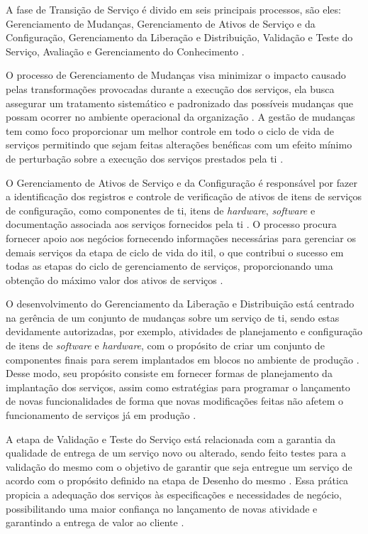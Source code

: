 A fase de Transição de Serviço é divido em seis principais processos, são eles: Gerenciamento de Mudanças, Gerenciamento de Ativos de Serviço e da Configuração, Gerenciamento da Liberação e Distribuição, Validação e Teste do Serviço, Avaliação e Gerenciamento do Conhecimento \cite{abreu2012implantando, servicetransiction}.

O processo de Gerenciamento de Mudanças visa minimizar o impacto causado pelas transformações provocadas durante a execução dos serviços, ela busca assegurar um tratamento sistemático e padronizado das possíveis mudanças que possam ocorrer no ambiente operacional da organização \cite{abreu2012implantando}. A gestão de mudanças tem como foco proporcionar um melhor controle em todo o ciclo de vida de serviços permitindo que sejam feitas alterações benéficas com um efeito mínimo de perturbação sobre a execução dos serviços prestados pela \acrshort{ti} \cite{introductoryoverviewofitil}.

O Gerenciamento de Ativos de Serviço e da Configuração é responsável por fazer a identificação dos registros e controle de verificação de ativos de itens de serviços de configuração, como componentes de \acrshort{ti}, itens de \textit{hardware}, \textit{software} e documentação associada aos serviços fornecidos pela \acrshort{ti} \cite{abreu2012implantando}. O processo procura fornecer apoio aos negócios fornecendo informações necessárias para gerenciar os demais serviços da etapa de ciclo de vida do \acrshort{itil}, o que contribui o sucesso em todas as etapas do ciclo de gerenciamento de serviços, proporcionando uma obtenção do máximo valor dos ativos de serviços \cite{introductoryoverviewofitil}.

O desenvolvimento do Gerenciamento da Liberação e Distribuição está centrado na gerência de um conjunto de mudanças sobre um serviço de \acrshort{ti}, sendo estas devidamente autorizadas, por exemplo, atividades de planejamento e configuração de itens de \textit{software} e \textit{hardware}, com o propósito de criar um conjunto de componentes finais para serem implantados em blocos no ambiente de produção \cite{abreu2012implantando}. Desse modo, seu propósito consiste em fornecer formas de planejamento da implantação dos serviços, assim como estratégias para programar o lançamento de novas funcionalidades de forma que novas modificações feitas não afetem o funcionamento de serviços já em produção \cite{introductoryoverviewofitil}.

A etapa de Validação e Teste do Serviço está relacionada com a garantia da qualidade de entrega de um serviço novo ou alterado, sendo feito testes para a validação do mesmo com o objetivo de garantir que seja entregue um serviço de acordo com o propósito definido na etapa de Desenho do mesmo \cite{abreu2012implantando}. Essa prática propicia a adequação dos serviços às especificações e necessidades de negócio, possibilitando uma maior confiança no lançamento de novas atividade e garantindo a entrega de valor ao cliente \cite{introductoryoverviewofitil}.

